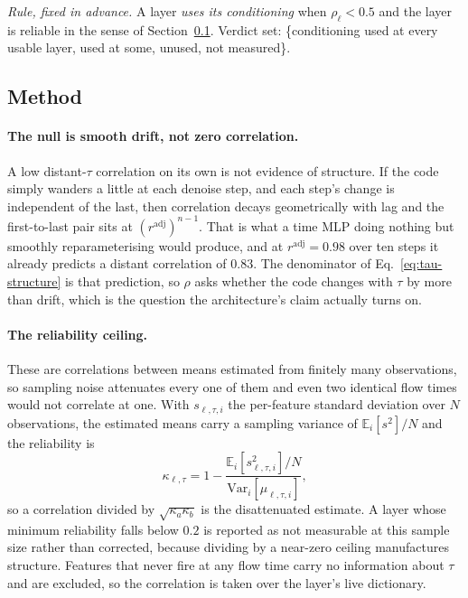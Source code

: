 \emph{Rule, fixed in advance.} A layer \emph{uses its conditioning} when
$\rho_{\ell} < 0.5$ and the layer is reliable in the sense of
Section~\ref{sec:tau-method}. Verdict set: \{conditioning used at every usable
layer, used at some, unused, not measured\}.

\subsection{Method}
\label{sec:tau-method}

\paragraph{The null is smooth drift, not zero correlation.}
A low distant-$\tau$ correlation on its own is not evidence of structure. If the
code simply wanders a little at each denoise step, and each step's change is
independent of the last, then correlation decays geometrically with lag and the
first-to-last pair sits at $(r^{\mathrm{adj}})^{n-1}$. That is what a time MLP
doing nothing but smoothly reparameterising would produce, and at
$r^{\mathrm{adj}}=0.98$ over ten steps it already predicts a distant correlation
of $0.83$. The denominator of Eq.~\ref{eq:tau-structure} is that prediction, so
$\rho$ asks whether the code changes with $\tau$ by more than drift, which is
the question the architecture's claim actually turns on.

\paragraph{The reliability ceiling.}
These are correlations between means estimated from finitely many observations,
so sampling noise attenuates every one of them and even two identical flow times
would not correlate at one. With $s_{\ell,\tau,i}$ the per-feature standard
deviation over $N$ observations, the estimated means carry a sampling variance
of $\mathbb{E}_i[s^2]/N$ and the reliability is
\begin{equation}
\kappa_{\ell,\tau}
=
1 - \frac{\mathbb{E}_i\!\left[s_{\ell,\tau,i}^2\right]/N}
         {\mathrm{Var}_i\!\left[\mu_{\ell,\tau,i}\right]},
\label{eq:tau-reliability}
\end{equation}
so a correlation divided by $\sqrt{\kappa_a \kappa_b}$ is the disattenuated
estimate. A layer whose minimum reliability falls below $0.2$ is reported as not
measurable at this sample size rather than corrected, because dividing by a
near-zero ceiling manufactures structure. Features that never fire at any flow
time carry no information about $\tau$ and are excluded, so the correlation is
taken over the layer's live dictionary.

